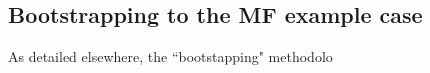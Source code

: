 \subsection{Bootstrapping to the MF example case}

As detailed elsewhere, the ``bootstapping" methodolo
